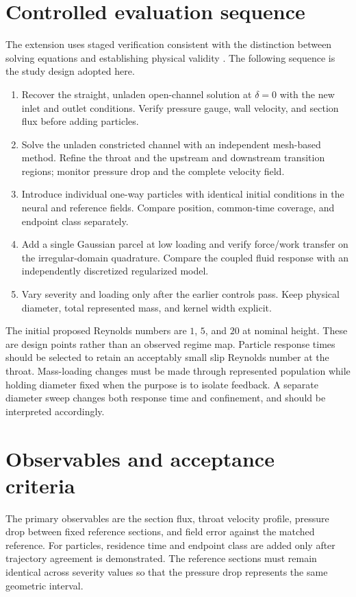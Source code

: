 \section{Controlled evaluation sequence}
The extension uses staged verification consistent with the distinction
between solving equations and establishing physical validity
\citep{oberkampf2002}. The following sequence is the study design adopted
here. %
\begin{enumerate}
\item Recover the straight, unladen open-channel solution at $\delta=0$
with the new inlet and outlet conditions. Verify pressure gauge, wall
velocity, and section flux before adding particles.
\item Solve the unladen constricted channel with an independent mesh-based
method. Refine the throat and the upstream and downstream transition
regions; monitor pressure drop and the complete velocity field.
\item Introduce individual one-way particles with identical initial
conditions in the neural and reference fields. Compare position,
common-time coverage, and endpoint class separately.
\item Add a single Gaussian parcel at low loading and verify force/work
transfer on the irregular-domain quadrature. Compare the coupled fluid
response with an independently discretized regularized model.
\item Vary severity and loading only after the earlier controls pass.
Keep physical diameter, total represented mass, and kernel width explicit.
\end{enumerate}

The initial proposed Reynolds numbers are $1$, $5$, and $20$ at nominal
height. These are design points rather than an observed regime map.
Particle response times should be selected to retain an acceptably small
slip Reynolds number at the throat. Mass-loading changes must be made
through represented population while holding diameter fixed when the
purpose is to isolate feedback. A separate diameter sweep changes both
response time and confinement, and should be interpreted accordingly.

\section{Observables and acceptance criteria}
The primary observables are the section flux, throat velocity profile,
pressure drop between fixed reference sections, and field error against
the matched reference. For particles, residence time and endpoint class
are added only after trajectory agreement is demonstrated. The reference
sections must remain identical across severity values so that the pressure
drop represents the same geometric interval.

